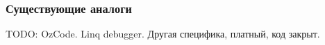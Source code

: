 \begin{frame}
\frametitle{Существующие аналоги} %
TODO: OzCode. Linq debugger. Другая специфика, платный, код закрыт.
\end{frame}

